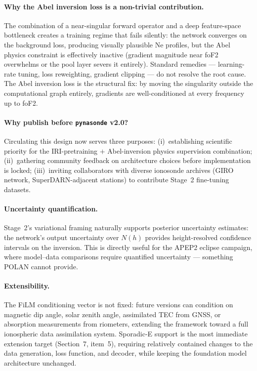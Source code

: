 \documentclass[11pt,twocolumn]{article}
\begin{document}
\paragraph{Why the Abel inversion loss is a non-trivial contribution.}
The combination of a near-singular forward operator and a deep feature-space
bottleneck creates a training regime that fails silently: the network converges
on the background loss, producing visually plausible Ne profiles, but the Abel
physics constraint is effectively inactive (gradient magnitude near foF2 overwhelms
or the pool layer severs it entirely).
Standard remedies --- learning-rate tuning, loss reweighting, gradient clipping ---
do not resolve the root cause.
The Abel inversion loss is the structural fix: by moving the singularity outside
the computational graph entirely, gradients are well-conditioned at every
frequency up to foF2.

\paragraph{Why publish before \texttt{pynasonde} v2.0?}
Circulating this design now serves three purposes: (i)~establishing scientific
priority for the IRI-pretraining $+$ Abel-inversion physics supervision combination;
(ii)~gathering community feedback on architecture choices before implementation
is locked; (iii)~inviting collaborators with diverse ionosonde archives (GIRO
network, SuperDARN-adjacent stations) to contribute Stage~2 fine-tuning datasets.

\paragraph{Uncertainty quantification.}
Stage~2's variational framing naturally supports posterior uncertainty estimates:
the network's output uncertainty over $N(h)$ provides height-resolved confidence
intervals on the inversion.
This is directly useful for the APEP2 eclipse campaign, where model--data
comparisons require quantified uncertainty — something POLAN cannot provide.

\paragraph{Extensibility.}
The FiLM conditioning vector is not fixed: future versions can condition on
magnetic dip angle, solar zenith angle, assimilated TEC from GNSS, or
absorption measurements from riometers, extending the framework toward a full
ionospheric data assimilation system.
Sporadic-E support is the most immediate extension target (Section~7, item~5),
requiring relatively contained changes to the data generation, loss function,
and decoder, while keeping the foundation model architecture unchanged.
\end{document}
